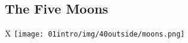 \subsection*{The Five Moons}

\begin{table*}[b]%
    \begin{DndTable}[width=\linewidth]{X}
        \centering
        \texttt{[image: 01intro/img/40outside/moons.png]}
    \end{DndTable}
\end{table*}

\newpage~\newpage

